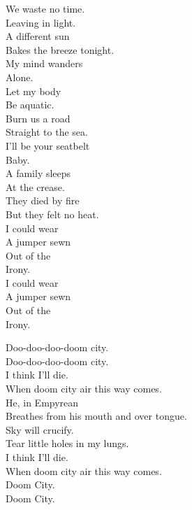 We waste no time. \\
Leaving in light. \\
A different sun \\
Bakes the breeze tonight. \\

My mind wanders \\
Alone. \\
Let my body \\
Be aquatic. \\

Burn us a road \\
Straight to the sea. \\
I'll be your seatbelt \\
Baby. \\

A family sleeps \\
At the crease. \\
They died by fire \\
But they felt no heat. \\
I could wear \\
A jumper sewn \\
Out of the \\
Irony. \\

I could wear \\
A jumper sewn \\
Out of the \\
Irony. \\




Doo-doo-doo-doom city. \\
Doo-doo-doo-doom city. \\

I think I'll die. \\
When doom city air this way comes. \\
He, in Empyrean \\
Breathes from his mouth and over tongue. \\
Sky will crucify. \\
Tear little holes in my lungs. \\
I think I'll die. \\
When doom city air this way comes. \\

Doom City. \\
Doom City. \\

